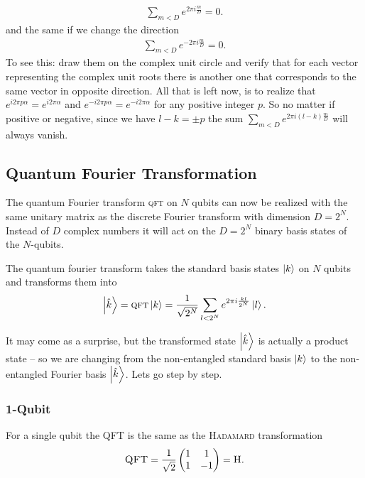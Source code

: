 \begin{align}
    \sum_{m<D} e^{2\pi i\frac{m}{D}} = 0.
\end{align}
and the same if we change the direction
\begin{align}
    \sum_{m<D} e^{-2\pi i\frac{m}{D}} = 0.
\end{align}
To see this: draw them on the complex unit circle and verify that for each vector representing the complex unit roots there is another one that corresponds to the same vector in opposite direction. All that is left now, is to realize that $e^{i2\pi p \alpha} = e^{i2\pi \alpha} $ and $e^{-i2\pi p \alpha} = e^{-i2\pi \alpha} $ for any positive integer $p$. So no matter if positive or negative, since we have $l-k = \pm p$ the sum $\sum_{m<D} e^{2\pi i (l-k) \frac{m}{D}}$  will always vanish.

\subsection{Quantum Fourier Transformation}
The quantum Fourier transform \textsc{qft} on $N$ qubits can now be realized with the same unitary matrix as the discrete Fourier transform with dimension $D=2^N$. Instead of $D$ complex numbers it will act on the $D = 2^N$ binary basis states of the $N$-qubits.
\begin{def*}
The quantum fourier transform takes the standard basis states $\ket{k}$ on $N$ qubits and transforms them into
\begin{align}
    \ket{\hat{k}} = \textsc{qft} \ket{k} = \frac{1}{\sqrt{2^N}}\sum_{l<2^N} e^{2\pi i \frac{kl}{2^N}}\ket{l}.\label{eq:qft}
\end{align}
\end{def*}
It may come as a surprise, but the transformed state $\ket{\hat{k}}$ is actually a product state -- so we are changing from the non-entangled standard basis $\ket{k}$ to the non-entangled Fourier basis $\ket{\hat{k}}$. Lets go step by step.
\subsubsection*{1-Qubit}
\begin{algo*}[\texttt{QFT}(N=1)]
 For a single qubit the \textsc{QFT} is the same as the \textsc{Hadamard} transformation
\begin{align}
    \textsc{QFT} = \frac{1}{\sqrt{2}} \begin{pmatrix}
        1 & 1 \\ 1 & -1 
    \end{pmatrix} = \textsc{H}.
\end{align}   
\end{algo*}

